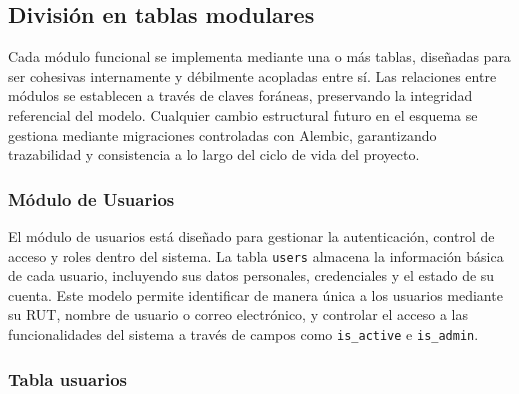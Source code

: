 \subsection{División en tablas modulares}\label{sec:div_tablas_modulares}

Cada módulo funcional se implementa mediante una o más tablas, diseñadas para 
ser cohesivas internamente y débilmente acopladas entre sí. Las relaciones entre 
módulos se establecen a través de claves foráneas, preservando la integridad 
referencial del modelo. Cualquier cambio estructural futuro en el esquema se 
gestiona mediante migraciones controladas con Alembic, garantizando trazabilidad 
y consistencia a lo largo del ciclo de vida del proyecto.

\subsubsection{Módulo de Usuarios}

El módulo de usuarios está diseñado para gestionar la autenticación, control de acceso y roles dentro del sistema. La tabla \texttt{users} almacena la información básica de cada usuario, incluyendo sus datos personales, credenciales y el estado de su cuenta. Este modelo permite identificar de manera única a los usuarios mediante su RUT, nombre de usuario o correo electrónico, y controlar el acceso a las funcionalidades del sistema a través de campos como \texttt{is\_active} e \texttt{is\_admin}.

\subsubsection*{Tabla usuarios}


